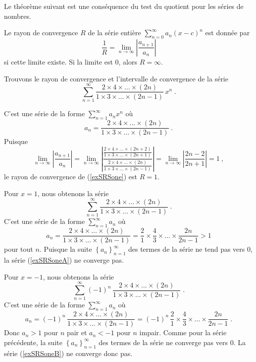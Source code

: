 {Le théorème suivant est une conséquence du test du quotient pour les séries
de nombres.

\begin{focus}{\thm} \label{RadiusConvComp}
Le rayon de convergence $R$ de la série entière
$\displaystyle \sum_{n=0}^\infty a_n (x-c)^n$ est donnée par
\[
\frac{1}{R} = \lim_{n\rightarrow \infty} \left|\frac{a_{n+1}}{a_n}\right|
\]
si cette limite existe.  Si la limite est $0$, alors $R=\infty$.
\end{focus}

\begin{egg}
Trouvons le rayon de convergence et l'intervalle de convergence de la série
\begin{equation}\label{exSRSone}
\sum_{n=1}^\infty \frac{2\times 4 \times \ldots \times (2n)}
{1 \times 3 \times \ldots \times (2n-1)} \, x^n \; .
\end{equation}

C'est une série de la forme $\displaystyle \sum_{n=1}^\infty a_n x^n$ où
\[
a_n = \frac{2 \times 4 \times \ldots \times (2n)}
{1 \times 3 \times \ldots \times (2n-1)} \; .
\]
Puisque
\[
\lim_{n\rightarrow \infty} \left| \frac{a_{n+1}}{a_n}\right|
= \lim_{n\rightarrow \infty} \left|
\frac{\displaystyle \frac{2 \times 4 \times \ldots \times (2n+2)}
{\displaystyle 1 \times 3 \times \ldots \times (2n+1)}}
{\displaystyle \frac{2 \times 4 \times \ldots \times (2n)}
{\displaystyle 1 \times 3 \times \ldots \times (2n-1)}} \right|
= \lim_{n\rightarrow \infty} \left| \frac{2n-2}{2n+1} \right| = 1 \ ,
\]
le rayon de convergence de (\ref{exSRSone}) est $R=1$.

Pour $x=1$, nous obtenons la série
\begin{equation}\label{exSRSoneA}
\sum_{n=1}^\infty \frac{2\times 4 \times \ldots \times (2n)}
{1 \times 3 \times \ldots \times (2n-1)} \; .
\end{equation}
C'est une série de la forme $\displaystyle \sum_{n=1}^\infty a_n$ où
\[
a_n = \frac{2\times 4 \times \ldots \times (2n)}
{1 \times 3 \times \ldots \times (2n-1)}
 = \frac{2}{1}\times \frac{4}{3} \times \ldots \times \frac{2n}{2n-1}
>1
\]
pour tout $n$.  Puisque la suite
$\displaystyle \left\{ a_n \right\}_{n=1}^\infty$ des termes de la
série ne tend pas vers $0$, la série (\ref{exSRSoneA}) ne converge
pas.

Pour $x=-1$, nous obtenons la série
\begin{equation}\label{exSRSoneB}
\sum_{n=1}^\infty (-1)^n \,\frac{2\times 4 \times \ldots \times (2n)}
{1 \times 3 \times \ldots \times (2n-1)} \; .
\end{equation}
C'est une série de la forme
$\displaystyle \sum_{n=1}^\infty a_n$ où
\[
a_n = (-1)^n \, \frac{2\times 4 \times \ldots \times (2n)}
{1 \times 3 \times \ldots \times (2n-1)}
 = (-1)^n \,\frac{2}{1}\times \frac{4}{3} \times \ldots \times
\frac{2n}{2n-1} \; .
\]
Donc $a_n > 1$ pour $n$ pair et $a_n<-1$ pour $n$ impair.  Comme pour la
série précédente, la suite
$\displaystyle \left\{ a_n \right\}_{n=1}^\infty$ des termes de la
série ne converge pas vers $0$.  La série (\ref{exSRSoneB}) ne
converge donc pas.


\end{egg}}
